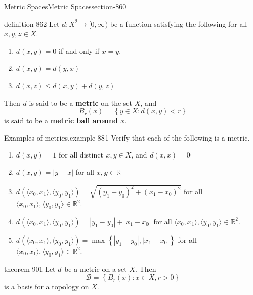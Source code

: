 \documentclass[oneside,10pt,]{article}
\newcommand{\terminology}[1]{\textbf{#1}}
\newcommand{\tuple}[1]{\langle #1 \rangle}
\newcommand{\mb}{\mathbb}
\newcommand{\mc}{\mathcal}
\newcommand{\setBuilder}[2]{\left\{#1:#2\right\}}
\newcommand{\setList}[1]{\left\{#1\right\}}
\newcommand{\lt}{<}
\begin{document}
\begin{sectionptx}{Metric Spaces}{}{Metric Spaces}{}{}{section-860}
\begin{definition}{}{definition-862}%
\hypertarget{p-863}{}%
Let \(d:X^2\to[0,\infty)\) be a function satisfying the following for all \(x,y,z\in X\).%
\leavevmode%
\begin{enumerate}
\item\hypertarget{li-867}{}\(d(x,y)=0\) if and only if \(x=y\).%
\item\hypertarget{li-870}{}\(d(x,y)=d(y,x)\)%
\item\hypertarget{li-872}{}\(d(x,z)\leq d(x,y)+d(y,z)\)%
\end{enumerate}
\hypertarget{p-874}{}%
Then \(d\) is said to be a \terminology{metric} on the set \(X\), and%
\begin{equation*}
B_r(x)=\setBuilder{y\in X}{d(x,y)\lt r}
\end{equation*}
is said to be a \terminology{metric ball around \(x\)}.%
\end{definition}
\begin{example}{Examples of metrics.}{example-881}%
\hypertarget{p-883}{}%
Verify that each of the following is a metric.%
\leavevmode%
\begin{enumerate}
\item\hypertarget{li-885}{}\(d(x,y)=1\) for all distinct \(x,y\in X\), and \(d(x,x)=0\)%
\item\hypertarget{li-889}{}\(d(x,y)=|y-x|\) for all \(x,y\in\mb R\)%
\item\hypertarget{li-892}{}\(d(\tuple{x_0,x_1},\tuple{y_0,y_1})=\sqrt{(y_1-y_0)^2+(x_1-x_0)^2}\) for all \(\tuple{x_0,x_1},\tuple{y_0,y_1}\in\mb R^2\).%
\item\hypertarget{li-895}{}\(d(\tuple{x_0,x_1},\tuple{y_0,y_1})=|y_1-y_0|+|x_1-x_0|\) for all \(\tuple{x_0,x_1},\tuple{y_0,y_1}\in\mb R^2\).%
\item\hypertarget{li-898}{}\(d(\tuple{x_0,x_1},\tuple{y_0,y_1})=\max\setList{|y_1-y_0|,|x_1-x_0|}\) for all \(\tuple{x_0,x_1},\tuple{y_0,y_1}\in\mb R^2\).%
\end{enumerate}
\end{example}
\begin{theorem}{}{}{theorem-901}%
\hypertarget{p-902}{}%
Let \(d\) be a metric on a set \(X\). Then%
\begin{equation*}
\mc B=\setBuilder{B_r(x)}{x\in X,r>0}
\end{equation*}
is a basis for a topology on \(X\).%
\end{theorem}

\end{sectionptx}
\end{document}
